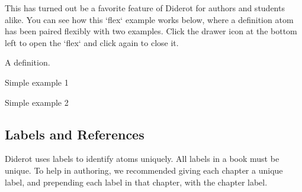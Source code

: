 \begin{note}
This has turned out be a favorite feature of Diderot for authors and students alike. 
%
You can see how this `flex` example works below, where a definition atom
has been paired flexibly with two examples.  Click the drawer icon
at the bottom left to open the `flex` and click again to close it.
\end{note}

\begin{flex}
\begin{definition}[A Definition]
\label{def:a}
A definition.
\end{definition}

\begin{example}
\label{ex:simple-1}
Simple example 1
\end{example}

\begin{example}
\label{ex:simple-2}
Simple example 2
\end{example}

\end{flex}
  

\subsection{Labels and References}
\label{sec:dc::labels-refs}
Diderot uses labels to identify atoms uniquely. All labels in a book
must be unique.  To help in authoring, we recommended giving each
chapter a unique label, and prepending each label in that chapter,
with the chapter label.


